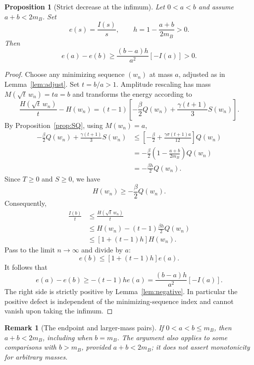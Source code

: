 \documentclass[11pt,letterpaper]{article}
\numberwithin{equation}{section}
\newtheorem{proposition}[theorem]{Proposition}
\newtheorem{remark}[theorem]{Remark}
\begin{document}
\begin{proposition}[Strict decrease at the infimum]\label{prop:gap}
Let $0<a<b$ and assume $a+b<2m_B$. Set
\[
 e(s)=\frac{I(s)}s,\qquad
 h=1-\frac{a+b}{2m_B}>0.
\]
Then
\begin{equation}\label{eq:gap}
 \boxed{\ e(a)-e(b)\ge\frac{(b-a)h}{a^2}[-I(a)]>0.\ }
\end{equation}
\end{proposition}
\begin{proof}
Choose any minimizing sequence $(w_n)$ at mass $a$, adjusted as in Lemma~\ref{lem:adjust}. Set $t=b/a>1$. Amplitude rescaling has mass $M(\sqrt t\,w_n)=ta=b$ and transforms the energy according to
\begin{equation}\label{eq:amp}
 \frac{H(\sqrt t\,w_n)}t-H(w_n)
 =(t-1)\left[-\frac\beta2 Q(w_n)
       +\frac{\gamma(t+1)}3S(w_n)\right].
\end{equation}
By Proposition~\ref{prop:SQ}, using $M(w_n)=a$,
\[
 \begin{aligned}
 -\frac\beta2 Q(w_n)+\frac{\gamma(t+1)}3S(w_n)
 &\le\left[-\frac\beta2+\frac{\gamma\sigma(t+1)a}{12}\right]Q(w_n)\\
 &=-\frac\beta2\left(1-\frac{a+b}{2m_B}\right)Q(w_n)\\
 &=-\frac{\beta h}{2}Q(w_n).
 \end{aligned}
\]
Since $T\ge0$ and $S\ge0$, we have
\[
 H(w_n)\ge-\frac\beta2Q(w_n).
\]
Consequently,
\begin{equation}\label{eq:uniform-inf}
 \begin{aligned}
 \frac{I(b)}t
 &\le\frac{H(\sqrt t\,w_n)}t\\
 &\le H(w_n)-(t-1)\frac{\beta h}{2}Q(w_n)\\
 &\le[1+(t-1)h]H(w_n).
 \end{aligned}
\end{equation}
Pass to the limit $n\to\infty$ and divide by $a$:
\[
 e(b)\le[1+(t-1)h]e(a).
\]
It follows that
\[
 e(a)-e(b)\ge-(t-1)he(a)
 =\frac{(b-a)h}{a^2}[-I(a)].
\]
The right side is strictly positive by Lemma~\ref{lem:negative}. In particular the positive defect is independent of the minimizing-sequence index and cannot vanish upon taking the infimum.
\end{proof}

\begin{remark}[The endpoint and larger-mass pairs]
If $0<a<b\le m_B$, then $a+b<2m_B$, including when $b=m_B$. The argument also applies to some comparisons with $b>m_B$, provided $a+b<2m_B$; it does not assert monotonicity for arbitrary masses.
\end{remark}
\end{document}
